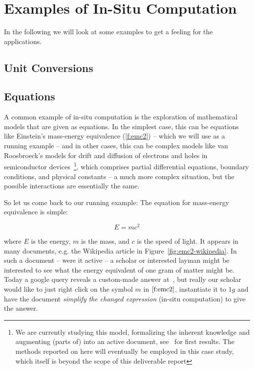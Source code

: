 \section{Examples of In-Situ Computation}\label{sec:examples}

In the following we will look at some examples to get a feeling for the applications.
\subsection{Unit Conversions}\label{sec:units}



\subsection{Equations}\label{sec:equations}

A common example of in-situ computation is the exploration of mathematical models that are
given as equations. In the simplest case, this can be equations like Einstein's
mass-energy equivalence (\ref{f:emc2}) -- which we will use as a running example -- and in
other cases, this can be complex models like van Roosbroeck's models for drift and
diffusion of electrons and holes in semiconductor devices~\cite{FarRotDoa:nmddm16}\footnote{We
  are currently studying this model, formalizing the inherent knowledge and augmenting
  (parts of) \cite{FarRotDoa:nmddm16} into an active document, see~\cite{KohKopMueTab:RCS} for
  first results. The methods reported on here will eventually be employed in this case
  study, which itself is beyond the scope of this deliverable report}, which comprises
partial differential equations, boundary conditions, and physical constants -- a much more
complex situation, but the possible interactions are essentially the same. 

So let us come back to our running example: The equation for mass-energy equivalence is
simple:

\begin{equation}\label{f:emc2}
  E=mc^2
\end{equation}

where $E$ is the energy, $m$ is the mass, and $c$ is the speed of light. It appears in
many documents, e.g. the Wikipedia article in Figure~\ref{fig:emc2-wikipedia}. In such a
document -- were it active -- a scholar or interested layman might be interested to see
what the energy equivalent of one gram of matter might be. Today a google query reveals a
custom-made answer at~\cite{Odenwald:q388}, but really our scholar would like to just right
click on the symbol $m$ in $\ref{f:emc2}$, instantiate it to $1g$ and have the document
\emph{simplify the changed expression} (in-situ computation) to give the answer.

